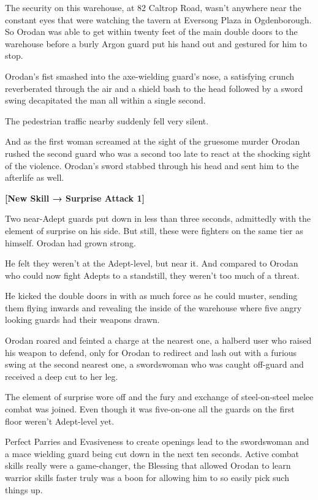\documentclass[a4paper,10pt]{book}
\begin{document}
The security on this warehouse, at 82 Caltrop Road, wasn’t anywhere near the constant eyes that were watching the tavern at Eversong Plaza in Ogdenborough. So Orodan was able to get within twenty feet of the main double doors to the warehouse before a burly Argon guard put his hand out and gestured for him to stop.\par
Orodan’s fist smashed into the axe-wielding guard’s nose, a satisfying crunch reverberated through the air and a shield bash to the head followed by a sword swing decapitated the man all within a single second.\par
The pedestrian traffic nearby suddenly fell very silent.\par
And as the first woman screamed at the sight of the gruesome murder Orodan rushed the second guard who was a second too late to react at the shocking sight of the violence. Orodan’s sword stabbed through his head and sent him to the afterlife as well.\par
\textbf{[New Skill → Surprise Attack 1]}\par
Two near-Adept guards put down in less than three seconds, admittedly with the element of surprise on his side. But still, these were fighters on the same tier as himself. Orodan had grown strong.\par
He felt they weren’t at the Adept-level, but near it. And compared to Orodan who could now fight Adepts to a standstill, they weren’t too much of a threat.\par
He kicked the double doors in with as much force as he could muster, sending them flying inwards and revealing the inside of the warehouse where five angry looking guards had their weapons drawn.\par
Orodan roared and feinted a charge at the nearest one, a halberd user who raised his weapon to defend, only for Orodan to redirect and lash out with a furious swing at the second nearest one, a swordswoman who was caught off-guard and received a deep cut to her leg.\par
The element of surprise wore off and the fury and exchange of steel-on-steel melee combat was joined. Even though it was five-on-one all the guards on the first floor weren’t Adept-level yet.\par
Perfect Parries and Evasiveness to create openings lead to the swordswoman and a mace wielding guard being cut down in the next ten seconds. Active combat skills really were a game-changer, the Blessing that allowed Orodan to learn warrior skills faster truly was a boon for allowing him to so easily pick such things up.\par
\end{document}
